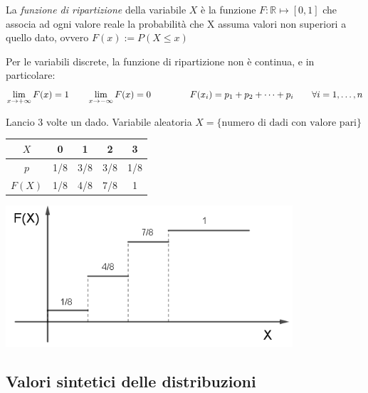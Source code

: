 \begin{definizione}
La \emph{funzione di ripartizione} della variabile $X$ è la funzione $F: \mathbb{R} \longmapsto [0,1]$ che associa ad ogni valore reale la probabilità che X assuma valori non superiori a quello dato, ovvero $F(x) := P(X\leq x)$
\end{definizione}

Per le variabili discrete, la funzione di ripartizione non è continua, e in particolare:
\[\lim_{x \rightarrow +\infty} F(x) = 1 \qquad \lim_{x \rightarrow -\infty} F(x) = 0 \hspace{1.5cm} F(x_i) = p_1+p_2+\dots+p_i  \qquad \forall i=1,\dots,n\]

\begin{esempio} Lancio 3 volte un dado. Variabile aleatoria $X = \{ \text{numero di dadi con valore pari}\}$\\

\begin{minipage}[c]{.45\textwidth}
\renewcommand\arraystretch{1.4}
\setlength\arraycolsep{25pt}
 \quad \begin{tabular}{c|c|c|c|c}
$X$ & 0 & 1 & 2 & 3\\
\hline
$p$ & 1/8 & 3/8 & 3/8 & 1/8\\
\hline
$F(X)$ & 1/8 & 4/8 & 7/8 & 1\\
\end{tabular}
\end{minipage}\hfil
\begin{minipage}[c]{.55\textwidth}
\includegraphics[width=0.8\textwidth]{img/ripartizione.png}
\end{minipage}
\end{esempio}

\subsection{Valori sintetici delle distribuzioni}

